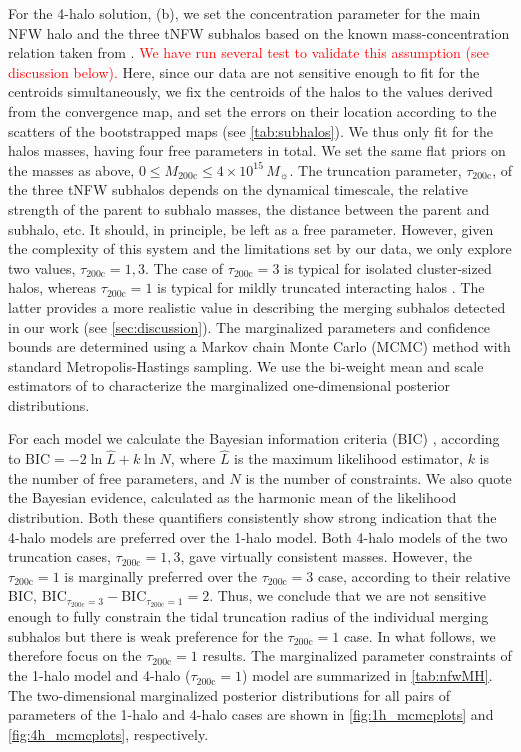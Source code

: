 \documentclass[iop,twocolumn]{emulateapj}
\def\munit{\mbox{$10^{15}\,M_\sun$}}
\begin{document}
For the 4-halo solution, (b), we  set the concentration parameter for the main NFW halo and the  three tNFW subhalos based on the known mass-concentration relation taken from \cite{Bhattacharya2013}. \textcolor{red}{We have run several test to validate this assumption (see discussion below). }
%
Here, since our data are not sensitive enough to fit for the centroids simultaneously, we fix the centroids of the halos to the values derived from the convergence map, and set the errors on their location according to the scatters of the bootstrapped maps (see \autoref{tab:subhalos}). We thus only fit for the halos masses, having four free parameters in total. We set the same flat priors on the masses as above, $0\leqslant M_\mathrm{200c}\leqslant4\times\munit$.
%
The truncation parameter, $\tau_\mathrm{200c}$, of the three tNFW subhalos depends on the dynamical timescale, the relative strength of the parent to subhalo masses, the distance between the parent and subhalo, etc. It should, in principle, be left as a free parameter. However, given the complexity of this system and the limitations set by our data, we only explore two values, $\tau_\mathrm{200c}=1,3$. The case of $\tau_\mathrm{200c}=3$ is typical for isolated cluster-sized halos, whereas $\tau_\mathrm{200c}=1$ is typical for mildly truncated interacting halos \citep{Takada2003}.  The latter provides a more realistic value in describing the merging subhalos detected in our work (see \autoref{sec:discussion}).
% 
The marginalized parameters and confidence bounds are determined using a Markov chain Monte Carlo (MCMC) method with standard Metropolis-Hastings sampling. We use the bi-weight mean and scale estimators of \cite{Beers1990} to characterize the marginalized one-dimensional posterior distributions. 


 
For each model we calculate the  Bayesian information criteria (BIC) \citep{Schwarz1978}, according to $\mathrm{BIC}=-2\ln\hat{L}+k\ln N$, where $\hat{L}$ is the maximum likelihood estimator, $k$ is the number of free parameters, and $N$ is the number of constraints. We also quote the Bayesian evidence, calculated as the harmonic mean of the likelihood distribution. Both these quantifiers consistently show strong indication that the 4-halo models are preferred over the 1-halo model. 
Both 4-halo models of the two truncation cases, $\tau_\mathrm{200c}=1,3$, gave virtually consistent masses. However, the $\tau_\mathrm{200c}=1$ is marginally preferred over the $\tau_\mathrm{200c}=3$ case, according to their relative BIC, $\mathrm{BIC}_{\tau_\mathrm{200c}=3} - \mathrm{BIC}_{\tau_\mathrm{200c}=1} = 2$.
Thus, we conclude that we are not sensitive enough to fully constrain the tidal truncation radius of the individual merging subhalos but there is weak preference for the $\tau_\mathrm{200c}=1$ case. In what follows, we therefore focus on the $\tau_\mathrm{200c}=1$ results. The marginalized parameter constraints of the 1-halo model and 4-halo ($\tau_\mathrm{200c}=1$) model are summarized in \autoref{tab:nfwMH}. 
The two-dimensional marginalized posterior distributions for all pairs of  parameters of the 1-halo and 4-halo cases are shown in \autoref{fig:1h_mcmcplots} and \autoref{fig:4h_mcmcplots}, respectively.
\end{document}
